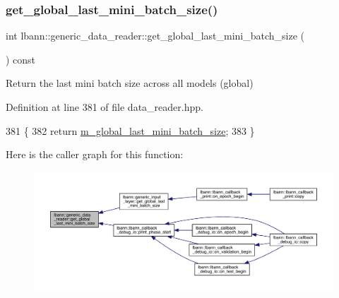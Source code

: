 \subsubsection{\texorpdfstring{get\+\_\+global\+\_\+last\+\_\+mini\+\_\+batch\+\_\+size()}{get\_global\_last\_mini\_batch\_size()}}
{\footnotesize\ttfamily int lbann\+::generic\+\_\+data\+\_\+reader\+::get\+\_\+global\+\_\+last\+\_\+mini\+\_\+batch\+\_\+size (\begin{DoxyParamCaption}{ }\end{DoxyParamCaption}) const\hspace{0.3cm}{\ttfamily [inline]}}



Return the last mini batch size across all models (global) 



Definition at line 381 of file data\+\_\+reader.\+hpp.


\begin{DoxyCode}
381                                               \{
382     \textcolor{keywordflow}{return} \hyperlink{classlbann_1_1generic__data__reader_a1d6f2d378a3f152e20b3def16f52c003}{m\_global\_last\_mini\_batch\_size};
383   \}
\end{DoxyCode}
Here is the caller graph for this function\+:\nopagebreak
\begin{figure}[H]
\begin{center}
\leavevmode
\includegraphics[width=350pt]{classlbann_1_1generic__data__reader_a96bb5c116c1a23822f6662b866df4a17_icgraph}
\end{center}
\end{figure}
\mbox{\label{classlbann_1_1generic__data__reader_aaa4110d53f59a127326e63ca4110b56b}} 
